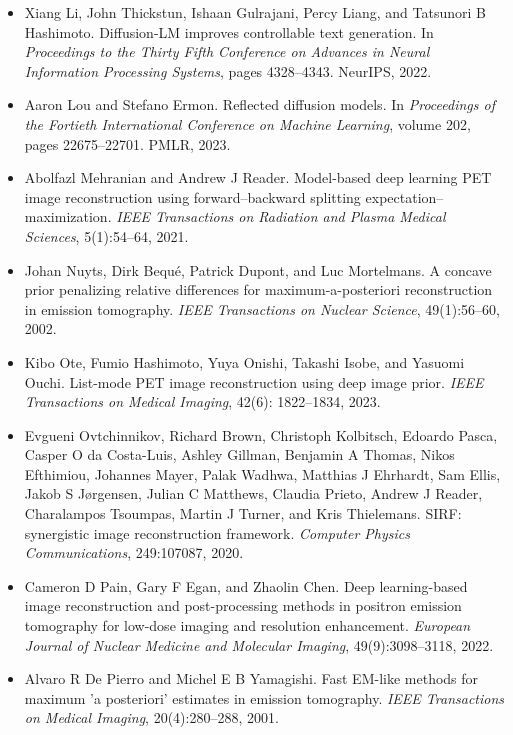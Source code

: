 \documentclass{article}
\begin{document}
\begin{itemize}
\item 
Xiang Li, John Thickstun, Ishaan Gulrajani, Percy Liang, and Tatsunori B Hashimoto. Diffusion-LM improves controllable text generation. In \textit{Proceedings to the Thirty Fifth Conference on Advances in Neural Information Processing Systems}, pages 4328–4343. NeurIPS, 2022.

\item 
Aaron Lou and Stefano Ermon. Reflected diffusion models. In \textit{Proceedings of the Fortieth International Conference on Machine Learning}, volume 202, pages 22675–22701. PMLR, 2023.

\item 
Abolfazl Mehranian and Andrew J Reader. Model-based deep learning PET image reconstruction using forward–backward splitting expectation–maximization. \textit{IEEE Transactions on Radiation and Plasma Medical Sciences}, 5(1):54–64, 2021.

\item 
Johan Nuyts, Dirk Bequé, Patrick Dupont, and Luc Mortelmans. A concave prior penalizing relative differences for maximum-a-posteriori reconstruction in emission tomography. \textit{IEEE Transactions on Nuclear Science}, 49(1):56–60, 2002.

\item 
Kibo Ote, Fumio Hashimoto, Yuya Onishi, Takashi Isobe, and Yasuomi Ouchi. List-mode PET image reconstruction using deep image prior. \textit{IEEE Transactions on Medical Imaging}, 42(6): 1822–1834, 2023.

\item 
Evgueni Ovtchinnikov, Richard Brown, Christoph Kolbitsch, Edoardo Pasca, Casper O da Costa-Luis, Ashley Gillman, Benjamin A Thomas, Nikos Efthimiou, Johannes Mayer, Palak Wadhwa, Matthias J Ehrhardt, Sam Ellis, Jakob S Jørgensen, Julian C Matthews, Claudia Prieto, Andrew J Reader, Charalampos Tsoumpas, Martin J Turner, and Kris Thielemans. SIRF: synergistic image reconstruction framework. \textit{Computer Physics Communications}, 249:107087, 2020.

\item 
Cameron D Pain, Gary F Egan, and Zhaolin Chen. Deep learning-based image reconstruction and post-processing methods in positron emission tomography for low-dose imaging and resolution enhancement. \textit{European Journal of Nuclear Medicine and Molecular Imaging}, 49(9):3098–3118, 2022.

\item 
Alvaro R De Pierro and Michel E B Yamagishi. Fast EM-like methods for maximum 'a posteriori' estimates in emission tomography. \textit{IEEE Transactions on Medical Imaging}, 20(4):280–288, 2001.


\end{itemize}
\end{document}
